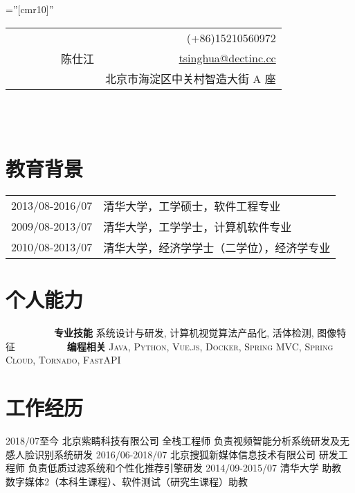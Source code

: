 \documentclass[a4paper,10pt]{professional-cv-cn}
\begin{document}
\pagestyle{empty}

\font\fb=''[cmr10]''

\begin{tabular}{lr}
\multirow{4}{24em}{\Huge ~~~~~~~~~陈仕江}

    & (+86)15210560972 \\

    & \href{mailto:tsinghua@dectinc.cc}{tsinghua@dectinc.cc} \\

    & 北京市海淀区中关村智造大街 A 座
\end{tabular}
\\
\\

\section{教育背景}
\begin{tabular}{rl}
 \textsc{2013/08-2016/07} & 清华大学，工学硕士，软件工程专业 \\
 \textsc{2009/08-2013/07} & 清华大学，工学学士，计算机软件专业 \\
 \textsc{2010/08-2013/07} & 清华大学，经济学学士（二学位），经济学专业
\end{tabular}

\section{个人能力}

\begin{entrylist}
  \internentry
    {~~~~~~~~~~\textbf{专业技能}}
    {}
    {}
    {\textsc{系统设计与研发}, \textsc{计算机视觉算法产品化}, \textsc{活体检测}, \textsc{图像特征}}
  \internentry
    {~~~~~~~~~~\textbf{编程相关}}
    {}
    {}
    {\textsc{Java}, \textsc{Python}, \textsc{Vue.js}, \textsc{Docker}, \textsc{Spring MVC}, \textsc{Spring Cloud}, \textsc{Tornado}, \textsc{FastAPI}}
\end{entrylist}

\section{工作经历}
\begin{entrylist}
  \internentry
    {2018/07至今}
    {北京紫睛科技有限公司}
    {全栈工程师}
    {负责视频智能分析系统研发及无感人脸识别系统研发}
  \internentry
    {2016/06-2018/07}
    {北京搜狐新媒体信息技术有限公司}
    {研发工程师}
    {负责低质过滤系统和个性化推荐引擎研发}
  \internentry
    {2014/09-2015/07}
    {清华大学}
    {助教}
    {数字媒体2（本科生课程）、软件测试（研究生课程）助教}
\end{entrylist}
\end{document}
